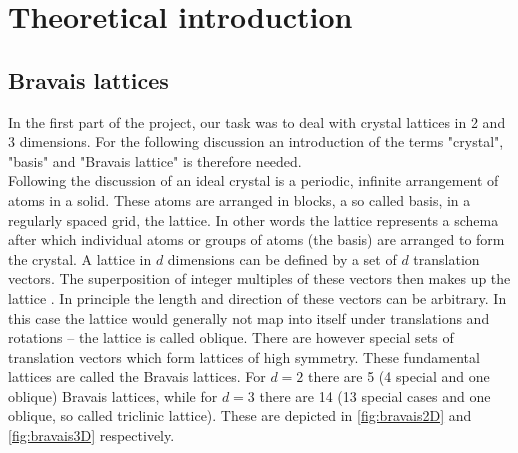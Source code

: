 \documentclass[11pt,a4paper]{article}
\begin{document}
\setcounter{page}{1}
 \pagestyle{plain}

\section{Theoretical introduction}
\label{sec:Theoretical introduction}

\subsection{Bravais lattices}
\label{ssec:Bravais lattices}
In the first part of the project, our task was to deal with crystal lattices in 2 and 3 dimensions. 
For the following discussion an introduction of the terms "crystal", "basis" and "Bravais lattice" is therefore needed. \\

Following the discussion of \cite{kittelChapter1Crystal2005} an ideal crystal is a periodic, infinite arrangement of atoms in a solid. 
These atoms are arranged in blocks, a so called basis, in a regularly spaced grid, the lattice. 
In other words the lattice represents a schema after which individual atoms or groups of atoms (the basis) are arranged to form the crystal. 
A lattice in $d$ dimensions can be defined by a set of $d$ translation vectors. 
The superposition of integer multiples of these vectors then makes up the lattice \cite{kittelChapter1Crystal2005}. 
In principle the length and direction of these vectors can be arbitrary. 
In this case the lattice would generally not map into itself under translations and rotations -- the lattice is called oblique. 
There are however special sets of translation vectors which form lattices of high symmetry. 
These fundamental lattices are called the Bravais lattices. 
For $d=2$ there are 5 (4 special and one oblique) Bravais lattices, while for $d=3$ there are 14 (13 special cases and one oblique, so called triclinic lattice). 
These are depicted in \autoref{fig:bravais2D} and \autoref{fig:bravais3D} respectively. 
\end{document}
